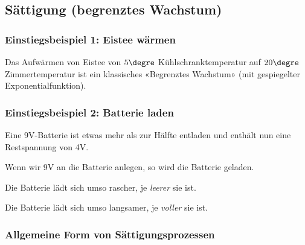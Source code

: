 

\newpage


\subsection{Sättigung (begrenztes Wachstum)}
\subsubsection{Einstiegsbeispiel 1: Eistee wärmen}
Das Aufwärmen von Eistee von $5\degre$ Kühlschranktemperatur auf $20\degre$ Zimmertemperatur ist ein klassisches «Begrenztes Wachstum» (mit gespiegelter Exponentialfunktion).


\subsubsection{Einstiegsbeispiel 2: Batterie laden}
\begin{center}
\end{center}

Eine 9V-Batterie ist etwas mehr als zur Hälfte entladen und enthält nun eine
Restspannung von 4V.

Wenn wir 9V an die Batterie anlegen, so wird die Batterie geladen.

Die Batterie lädt sich umso rascher, je \textit{leerer} sie ist.

Die Batterie lädt sich umso langsamer, je \textit{voller} sie ist.


\newpage

\subsubsection{Allgemeine Form von Sättigungsprozessen}

